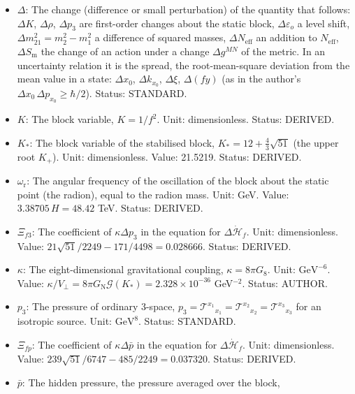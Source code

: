 \documentclass[
  10pt,
]{article}
\providecommand{\tightlist}{%
  \setlength{\itemsep}{0pt}\setlength{\parskip}{0pt}}
\begin{document}
\begin{itemize}
\tightlist
\item
  \(\Delta\): The change (difference or small perturbation) of the
  quantity that follows: \(\Delta K\), \(\Delta\rho\), \(\Delta p_3\)
  are first-order changes about the static block,
  \(\Delta\varepsilon_o\) a level shift,
  \(\Delta m^2_{21} = m_2^2 - m_1^2\) a difference of squared masses,
  \(\Delta N_{\mathrm{eff}}\) an addition to \(N_{\mathrm{eff}}\),
  \(\Delta S_{\mathrm{m}}\) the change of an action under a change
  \(\Delta g^{MN}\) of the metric. In an uncertainty relation it is the
  spread, the root-mean-square deviation from the mean value in a state:
  \(\Delta x_0\), \(\Delta k_{x_0}\), \(\Delta\xi\), \(\Delta(fy)\) (as
  in the author's \(\Delta x_0\,\Delta p_{x_0} \ge \hbar/2\)). Status:
  STANDARD.
\item
  \(K\): The block variable, \(K = 1/f^2\). Unit: dimensionless. Status:
  DERIVED.
\item
  \(K_*\): The block variable of the stabilised block,
  \(K_* = 12 + \frac43\sqrt{51}\) (the upper root \(K_+\)). Unit:
  dimensionless. Value: 21.5219. Status: DERIVED.
\item
  \(\omega_{\mathrm{r}}\): The angular frequency of the oscillation of
  the block about the static point (the radion), equal to the radion
  mass. Unit: GeV. Value: \(3.38705\,H = 48.42\) TeV. Status: DERIVED.
\item
  \(\Xi_{f3}\): The coefficient of \(\kappa\Delta p_3\) in the equation
  for \(\Delta\dot{\mathcal{H}}_f\). Unit: dimensionless. Value:
  \(21\sqrt{51}/2249 - 171/4498 = 0.028666\). Status: DERIVED.
\item
  \(\kappa\): The eight-dimensional gravitational coupling,
  \(\kappa = 8\pi G_8\). Unit: \(\mathrm{GeV}^{-6}\). Value:
  \(\kappa/V_\perp = 8\pi G_{\mathrm{N}}\mathcal{G}(K_*) = 2.328\times10^{-36}\)
  GeV\(^{-2}\). Status: AUTHOR.
\item
  \(p_3\): The pressure of ordinary 3-space,
  \(p_3 = \mathcal{T}^{x_1}{}_{x_1} = \mathcal{T}^{x_2}{}_{x_2} = \mathcal{T}^{x_3}{}_{x_3}\)
  for an isotropic source. Unit: \(\mathrm{GeV}^{8}\). Status: STANDARD.
\item
  \(\Xi_{fp}\): The coefficient of \(\kappa\Delta\bar p\) in the
  equation for \(\Delta\dot{\mathcal{H}}_f\). Unit: dimensionless.
  Value: \(239\sqrt{51}/6747 - 485/2249 = 0.037320\). Status: DERIVED.
\item
  \(\bar p\): The hidden pressure, the pressure averaged over the block,

\end{itemize}
\end{document}
